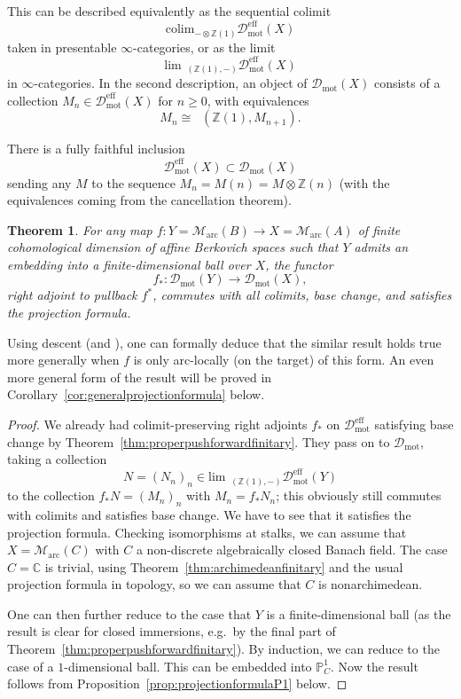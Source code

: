 \documentclass[11pt]{amsart}
\DeclareMathOperator{\intHom}{\!{\mathscr{H}\! om}}
\numberwithin{equation}{section}
\newtheorem{theorem}{Theorem}
\numberwithin{theorem}{section}
\theoremstyle{definition}
\begin{document}
This can be described equivalently as the sequential colimit
\[
\mathrm{colim}_{-\otimes \mathbb Z(1)} \mathcal D_{\mathrm{mot}}^{\mathrm{eff}}(X)
\]
taken in presentable $\infty$-categories, or as the limit
\[
\mathrm{lim}_{\intHom(\mathbb Z(1),-)} \mathcal D_{\mathrm{mot}}^{\mathrm{eff}}(X)
\]
in $\infty$-categories. In the second description, an object of $\mathcal D_{\mathrm{mot}}(X)$ consists of a collection $M_n\in \mathcal D_{\mathrm{mot}}^{\mathrm{eff}}(X)$ for $n\geq 0$, with equivalences
\[
M_n\cong \intHom(\mathbb Z(1),M_{n+1}).
\]

There is a fully faithful inclusion
\[
\mathcal D_{\mathrm{mot}}^{\mathrm{eff}}(X)\subset \mathcal D_{\mathrm{mot}}(X)
\]
sending any $M$ to the sequence $M_n = M(n)=M\otimes \mathbb Z(n)$ (with the equivalences coming from the cancellation theorem).

\begin{theorem} For any map $f: Y=\mathcal M_{\mathrm{arc}}(B)\to X=\mathcal M_{\mathrm{arc}}(A)$ of finite cohomological dimension of affine Berkovich spaces such that $Y$ admits an embedding into a finite-dimensional ball over $X$, the functor
\[
f_\ast: \mathcal D_{\mathrm{mot}}(Y)\to \mathcal D_{\mathrm{mot}}(X),
\]
right adjoint to pullback $f^\ast$, commutes with all colimits, base change, and satisfies the projection formula.
\end{theorem}

Using descent (and \cite[Corollary 4.7.4.18]{LurieHA}), one can formally deduce that the similar result holds true more generally when $f$ is only arc-locally (on the target) of this form. An even more general form of the result will be proved in Corollary~\ref{cor:generalprojectionformula} below.

\begin{proof} We already had colimit-preserving right adjoints $f_\ast$ on $\mathcal D_{\mathrm{mot}}^{\mathrm{eff}}$ satisfying base change by Theorem~\ref{thm:properpushforwardfinitary}. They pass on to $\mathcal D_{\mathrm{mot}}$, taking a collection
\[
N=(N_n)_n\in \mathrm{lim}_{\intHom(\mathbb Z(1),-)} \mathcal D_{\mathrm{mot}}^{\mathrm{eff}}(Y)
\]
to the collection $f_\ast N=(M_n)_n$ with $M_n = f_\ast N_n$; this obviously still commutes with colimits and satisfies base change. We have to see that it satisfies the projection formula. Checking isomorphisms at stalks, we can assume that $X=\mathcal M_{\mathrm{arc}}(C)$ with $C$ a non-discrete algebraically closed Banach field. The case $C=\mathbb C$ is trivial, using Theorem~\ref{thm:archimedeanfinitary} and the usual projection formula in topology, so we can assume that $C$ is nonarchimedean.

One can then further reduce to the case that $Y$ is a finite-dimensional ball (as the result is clear for closed immersions, e.g.~by the final part of Theorem~\ref{thm:properpushforwardfinitary}). By induction, we can reduce to the case of a $1$-dimensional ball. This can be embedded into $\mathbb P^1_C$. Now the result follows from Proposition~\ref{prop:projectionformulaP1} below.
\end{proof}
\end{document}
